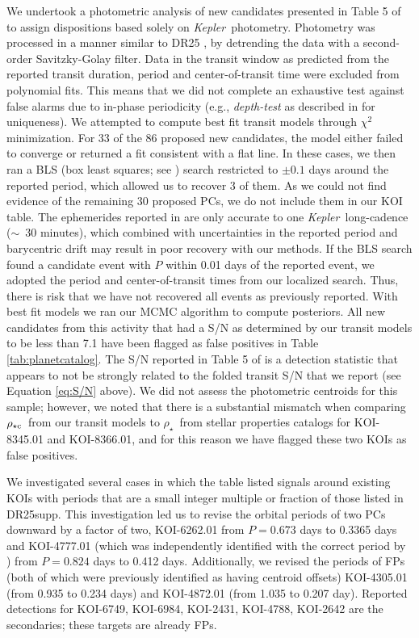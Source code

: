 \documentclass{aastex62}
\newcommand{\ik}{{\it Kepler~}}
\newcommand{\rhostar}{\ensuremath{\rho_\star}}
\newcommand{\rhoc}{\ensuremath{\rho_{\star {\rm c}}}}
\begin{document}
{We undertook a photometric analysis of new candidates presented in Table 5 of \cite{Caceres:2019} to assign dispositions based solely on \ik photometry.  Photometry was processed in a manner similar to DR25 \citep{Thompson:2018}, by detrending the data with a second-order Savitzky-Golay filter.  Data in the transit window as predicted from the reported transit duration, period and center-of-transit time were excluded from polynomial fits.  This means that we did not complete an exhaustive test against false alarms due to in-phase periodicity (e.g., {\it depth-test} as described in \citealt{Coughlin:2016} for uniqueness).  We attempted to compute best fit transit models through $\chi^2$ minimization.  For 33 of the 86 proposed new candidates, the model either failed to converge or returned a fit consistent with a flat line.  In these cases, we then ran a BLS ({box} least squares; see \citealt{Kovacs:2002}) search restricted to $\pm 0.1$ days around the reported period{, which allowed us to recover 3 of them. As we could not find evidence of the remaining 30 proposed PCs, we do not include them in our KOI table.}  The ephemerides reported in \cite{Caceres:2019} are only accurate to one \ik long-cadence ($\sim$~30 minutes), which combined with uncertainties in the reported period and barycentric drift may result in poor recovery with our methods.  If the BLS search found a candidate event with $P$ within 0.01 days of the reported event, we adopted the period and center-of-transit times from our localized search.  Thus, there is risk that we have not recovered all events as previously reported.  With best fit models we ran our MCMC algorithm to compute posteriors.  All new candidates from this activity that had a S/N as determined by our transit models to be less than 7.1 have been flagged as false positives in  Table \ref{tab:planetcatalog}.  The S/N reported in Table 5 of \cite{Caceres:2019} is a detection statistic that appears to not be strongly related to the folded transit S/N that we report (see Equation \ref{eq:S/N} above).  We did not assess the photometric centroids for this sample; however, we noted that there is a substantial mismatch when comparing \rhoc~from our transit models to \rhostar~from stellar properties catalogs for KOI-8345.01 and KOI-8366.01, and for this reason we have flagged these two KOIs as false positives.} %

{We investigated several cases in which the \cite{Caceres:2019} table listed signals around existing KOIs with periods that are a small integer multiple or fraction of those listed in DR25supp. This investigation led us to revise the orbital periods of two PCs downward by a factor of two, KOI-6262.01 from $P = 0.673$ days to 0.3365 days and KOI-4777.01 (which was independently identified with the correct period by \citealt{Canas:2022}) from $P = 0.824$ days to  0.412 days. Additionally, we revised the periods of FPs (both of which were previously identified as having centroid offsets) KOI-4305.01 (from 0.935 to 0.234 days) and KOI-4872.01 (from 1.035 to 0.207 day). Reported detections for KOI-6749, KOI-6984, KOI-2431, KOI-4788, KOI-2642 are the secondaries; these targets are already FPs.} 
\end{document}
